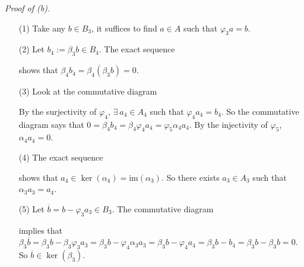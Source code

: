 \documentclass{article}
\begin{document}
\emph{Proof of (b).}
\begin{enumerate}
\item[(1)]
  Take any $b \in B_3$, it suffices to find $a \in A$ such that $\varphi_3 a = b$.

\item[(2)]
  Let $b_4 := \beta_3 b \in B_4$.
  The exact sequence
  \begin{center}
  \end{center}
  shows that $\beta_4 b_4 = \beta_4(\beta_3 b) = 0$.

\item[(3)]
  Look at the commutative diagram
  \begin{center}
  \end{center}
  By the surjectivity of $\varphi_4$,
  $\exists \: a_4 \in A_4$ such that $\varphi_4 a_4 = b_4$.
  So the commutative diagram says that
  $0 = \beta_4 b_4 = \beta_4 \varphi_4 a_4 = \varphi_5 \alpha_4 a_4$.
  By the injectivity of $\varphi_5$, $\alpha_4 a_4 = 0$.

\item[(4)]
  The exact sequence
  \begin{center}
  \end{center}
  shows that $a_4 \in \ker(\alpha_4) = \mathrm{im}(\alpha_3)$.
  So there exists $a_3 \in A_3$ such that $\alpha_3 a_3 = a_4$.

\item[(5)]
  Let $\overline{b} = b - \varphi_3 a_3 \in B_3$.
  The commutative diagram
  \begin{center}
  \end{center}
  implies that
  $\beta_3 \overline{b}
  = \beta_3 b - \beta_3 \varphi_3 a_3
  = \beta_3 b - \varphi_4 \alpha_3 a_3
  = \beta_3 b - \varphi_4 a_4
  = \beta_3 b - b_4
  = \beta_3 b - \beta_3 b = 0$.
  So $\overline{b} \in \ker(\beta_3)$.


\end{enumerate}
\end{document}
